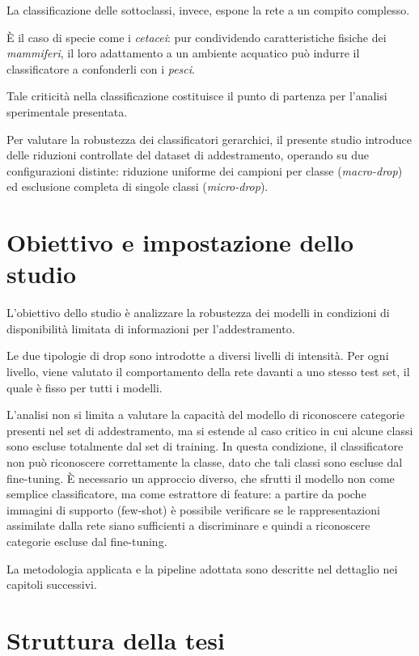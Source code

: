 La classificazione delle sottoclassi, invece, espone la rete a un compito complesso.

È il caso di specie come i \textit{cetacei}: pur condividendo caratteristiche fisiche dei \textit{mammiferi}, il loro adattamento a un ambiente acquatico può indurre il classificatore a confonderli con i \textit{pesci}.

Tale criticità nella classificazione costituisce il punto di partenza per l’analisi sperimentale presentata. 

Per valutare la robustezza dei classificatori gerarchici, il presente studio introduce delle riduzioni controllate del dataset di addestramento, 
operando su due configurazioni distinte: riduzione uniforme dei campioni per classe (\textit{macro-drop}) ed esclusione completa di singole classi (\textit{micro-drop}).

\section{Obiettivo e impostazione dello studio}

L’obiettivo dello studio è analizzare la robustezza dei modelli in condizioni di disponibilità limitata di informazioni per l’addestramento.

Le due tipologie di drop sono introdotte a diversi livelli di intensità. Per ogni livello, viene valutato il comportamento della rete davanti a uno stesso test set, il quale è fisso per tutti i modelli.

L’analisi non si limita a valutare la capacità del modello di riconoscere categorie presenti nel set di addestramento, ma si estende al caso critico in cui alcune classi sono escluse totalmente dal set di training. In questa condizione, il classificatore non può riconoscere correttamente la classe, dato che tali classi sono escluse dal fine-tuning. È necessario un approccio diverso, che sfrutti il modello non come semplice classificatore, ma come estrattore di feature: a partire da poche immagini di supporto (few-shot) è possibile verificare se le rappresentazioni assimilate dalla rete siano sufficienti a discriminare e quindi a riconoscere categorie escluse dal fine-tuning.

La metodologia applicata e la pipeline adottata sono descritte nel dettaglio nei capitoli successivi.

\clearpage
\section{Struttura della tesi}

